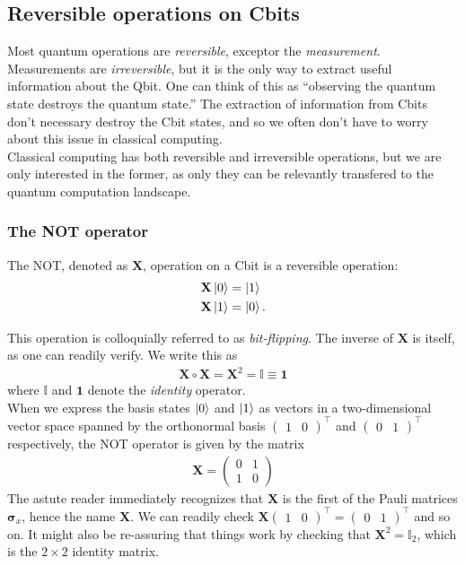 \documentclass{book}
\theoremstyle{definition}
\newcommand{\nn}{\nonumber}
\newcommand{\X}{\mathbf{X}}
\begin{document}
\subsection{Reversible operations on Cbits}

Most quantum operations are \textit{reversible}, exceptor the \textit{measurement}. Measurements are \textit{irreversible}, but it is the only way to extract useful information about the Qbit. One can think of this as ``observing the quantum state destroys the quantum state.'' The extraction of information from Cbits don't necessary destroy the Cbit states, and so we often don't have to worry about this issue in classical computing. \\

Classical computing has both reversible and irreversible operations, but we are only interested in the former, as only they can be relevantly transfered to the quantum computation landscape. 

\subsubsection{The NOT operator}

The NOT, denoted as $\textbf{X}$, operation on a Cbit is a reversible operation:
\begin{align}
\textbf{X}\ket{0} &= \ket{1} \nn\\
\textbf{X}\ket{1} &= \ket{0} .
\end{align}

This operation is colloquially referred to as \textit{bit-flipping}. The inverse of $\mathbf{X}$ is itself, as one can readily verify. We write this as
\begin{align}
\mathbf{X}\circ \mathbf{X} = \mathbf{X}^2 = \mathbb{I} \equiv \mathbf{1}
\end{align}
where $\mathbb{I}$ and $\mathbf{1}$ denote the \textit{identity} operator. \\

When we express the basis states $\ket{0}$ and $\ket{1}$ as vectors in a two-dimensional vector space spanned by the orthonormal basis $\begin{pmatrix}
1&0
\end{pmatrix}^\top$ and $\begin{pmatrix}
0&1
\end{pmatrix}^\top$ respectively, the NOT operator is given by the matrix
\begin{align}
\boxed{\mathbf{X} = \begin{pmatrix}
0&1 \\ 1&0
\end{pmatrix}}
\end{align}
The astute reader immediately recognizes that $\X$ is the first of the Pauli matrices $\bm{\sigma}_x$, hence the name $\X$. We can readily check $\mathbf{X}\begin{pmatrix}
1&0
\end{pmatrix}^\top = \begin{pmatrix}
0&1
\end{pmatrix}^\top$ and so on. It might also be re-assuring that things work by checking that $\mathbf{X}^2 = \mathbb{I}_2$, which is the $2\times 2$ identity matrix. 
\end{document}
